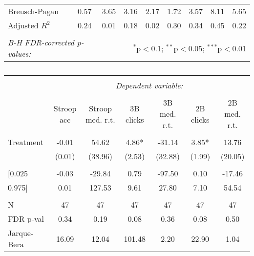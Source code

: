 \documentclass[a4paper,12pt]{article}
\begin{document}
\begin{sidewaystable}
\begin{center}
\begin{tabular}{@{\extracolsep{5pt}}lcccccccc}
Breusch-Pagan                & 0.57      & 3.65        & 3.16      & 2.17        & 1.72       & 3.57         & 8.11       & 5.65          \\
Adjusted $R^2$           & 0.24      & 0.01        & 0.18      & 0.02        & 0.30       & 0.34         & 0.45       & 0.22          \\
\hline \hline \\ [-1.8ex]
 \multicolumn{2}{l}{\textit{B-H FDR-corrected p-values:}}  & \multicolumn{7}{r}{$^{*}$p$<$0.1; $^{**}$p$<$0.05; $^{***}$p$<$0.01} \\
\end{tabular}
\end{center}
\end{sidewaystable}



\begin{sidewaystable}
  \caption{}
  \label{tbl:clicks}
\begin{center}
\begin{tabular}{@{\extracolsep{5pt}}lcccccc}
\hline
\hline \\
[-1.8ex] & \multicolumn{6}{c}{\textit{Dependent variable:}} \\
\cline{2-7} \\
[-1.8ex] & Stroop acc & Stroop med. r.t. & 3B clicks & 3B med. r.t. & 2B clicks & 2B med. r.t.  \\
\hline \\ [-1.8ex]
Treatment          & -0.01      & 54.62            & 4.86*     & -31.14       & 3.85*     & 13.76         \\
                 & (0.01)     & (38.96)          & (2.53)    & (32.88)      & (1.99)    & (20.05)       \\
\hline \\ [-1.8ex]
{[}0.025 &            -0.03 &           -29.84 &               0.79 &               -97.50 &             0.10 &             -17.46  \\
0.975{]} &             0.01 &           127.53 &               9.61 &                27.80 &             7.10 &              54.54  \\
\hline \\ [-1.8ex]
N                & 47         & 47               & 47        & 47           & 47        & 47            \\
FDR p-val        & 0.34       & 0.19             & 0.08      & 0.36         & 0.08      & 0.50          \\
Jarque-Bera      & 16.09      & 12.04            & 101.48    & 2.20         & 22.90     & 1.04          \\

\end{tabular}
\end{center}
\end{sidewaystable}
\end{document}
